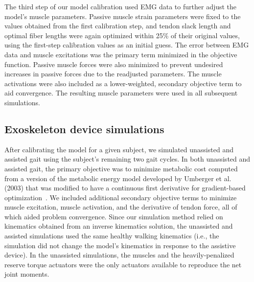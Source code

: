 \documentclass[10pt,letterpaper]{article}
\begin{document}
The third step of our model calibration used EMG data to further adjust the model's muscle parameters. Passive muscle strain parameters were fixed to the values obtained from the first calibration step, and tendon slack length and optimal fiber lengths were again optimized within 25\% of their original values, using the first-step calibration values as an initial guess. The error between EMG data and muscle excitations was the primary term minimized in the objective function. Passive muscle forces were also minimized to prevent undesired increases in passive forces due to the readjusted parameters. The muscle activations were also included as a lower-weighted, secondary objective term to aid convergence. The resulting muscle parameters were used in all subsequent simulations.

\subsection*{Exoskeleton device simulations}
After calibrating the model for a given subject, we simulated unassisted and assisted gait using the subject's remaining two gait cycles. In both unassisted and assisted gait, the primary objective was to minimize metabolic cost computed from a version of the metabolic energy model developed by Umberger et al. (2003) that was modified to have a continuous first derivative for gradient-based optimization~\cite{Umberger:2003, Koelewijn:2018}. We included additional secondary objective terms to minimize muscle excitation, muscle activation, and the derivative of tendon force, all of which aided problem convergence. Since our simulation method relied on kinematics obtained from an inverse kinematics solution, the unassisted and assisted simulations used the same healthy walking kinematics (i.e., the simulation did not change the model's kinematics in response to the assistive device). In the unassisted simulations, the muscles and the heavily-penalized reserve torque actuators were the only actuators available to reproduce the net joint moments.
\end{document}
